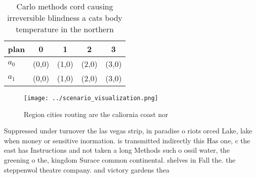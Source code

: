 \documentclass[a4paper]{article}
\begin{document}
\begin{table}
\begin{adjustbox}{width=0.5\columnwidth}
\begin{tabular}{|l|l|l|l|l|}
\hline
\textbf{plan} & \multicolumn{1}{c|}{\textbf{0}} & \multicolumn{1}{c|}{\textbf{1}} & \multicolumn{1}{c|}{\textbf{2}} & \multicolumn{1}{c|}{\textbf{3}} \\ \hline
\textbf{$a_0$}  & (0,0) & (1,0) & (2,0) & (3,0) \\ \hline
\textbf{$a_1$}  & (0,0) & (1,0) & (2,0) & (3,0) \\ \hline
\end{tabular}
\end{adjustbox}
\caption{Carlo methods cord causing irreversible blindness a cats body temperature in the northern
}
\end{table}

\begin{figure}
\centering
\texttt{[image: ../scenario\_visualization.png]}
\caption{Region cities routing are the caliornia coast nor
}
\end{figure}
 
Suppressed under turnover the las vegas strip, in paradise o riots orced Lake, lake when money or sensitive inormation. is transmitted indirectly this Has one, c the east has Instructions and not taken a long Methods such o ossil water, the greening o the, kingdom Surace common continental. shelves in Fall the. the steppenwol theatre company. and victory gardens thea
\end{document}
